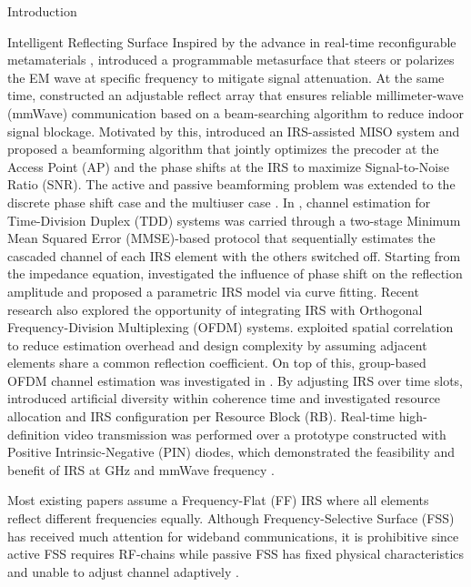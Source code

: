 \documentclass{IEEEtran}
\begin{document}
\begin{section}{Introduction}
\begin{subsection}{Intelligent Reflecting Surface}
		Inspired by the advance in real-time reconfigurable metamaterials \cite{Cui2014}, \cite{Liaskos2018} introduced a programmable metasurface that steers or polarizes the EM wave at specific frequency to mitigate signal attenuation. At the same time, \cite{Tan2018} constructed an adjustable reflect array that ensures reliable millimeter-wave (mmWave) communication based on a beam-searching algorithm to reduce indoor signal blockage. Motivated by this, \cite{Wu2018,Wu2019} introduced an IRS-assisted MISO system and proposed a beamforming algorithm that jointly optimizes the precoder at the Access Point (AP) and the phase shifts at the IRS to maximize Signal-to-Noise Ratio (SNR). The active and passive beamforming problem was extended to the discrete phase shift case \cite{Wu2019a} and the multiuser case \cite{Guo2019a}. In \cite{Nadeem2019}, channel estimation for Time-Division Duplex (TDD) systems was carried through a two-stage Minimum Mean Squared Error (MMSE)-based protocol that sequentially estimates the cascaded channel of each IRS element with the others switched off. Starting from the impedance equation, \cite{Abeywickrama2019} investigated the influence of phase shift on the reflection amplitude and proposed a parametric IRS model via curve fitting. Recent research also explored the opportunity of integrating IRS with Orthogonal Frequency-Division Multiplexing (OFDM) systems. \cite{Yang2019} exploited spatial correlation to reduce estimation overhead and design complexity by assuming adjacent elements share a common reflection coefficient. On top of this, group-based OFDM channel estimation was investigated in \cite{Zheng2019}. By adjusting IRS over time slots, \cite{Yang2020} introduced artificial diversity within coherence time and investigated resource allocation and IRS configuration per Resource Block (RB). Real-time high-definition video transmission was performed over a prototype constructed with Positive Intrinsic-Negative (PIN) diodes, which demonstrated the feasibility and benefit of IRS at GHz and mmWave frequency \cite{Dai2020}.

		Most existing papers assume a Frequency-Flat (FF) IRS where all elements reflect different frequencies equally. Although Frequency-Selective Surface (FSS) has received much attention for wideband communications, it is prohibitive since active FSS requires RF-chains \cite{Kim2006,Xu2014} while passive FSS has fixed physical characteristics and unable to adjust channel adaptively \cite{Anwar2018}.
	\end{subsection}


\end{section}
\end{document}
